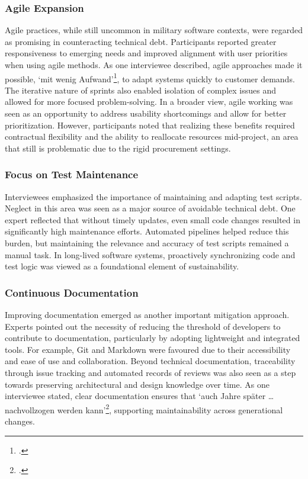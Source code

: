 \subsubsection{Agile Expansion}
Agile practices, while still uncommon in military software contexts, were regarded as promising in counteracting technical debt. Participants reported greater responsiveness to emerging needs and improved alignment with user priorities when using agile methods.
As one interviewee described, agile approaches made it possible, `mit wenig Aufwand'\footcite[85]{Interview32025}, to adapt systems quickly to customer demands. The iterative nature of sprints also enabled isolation of complex issues and allowed for more focused problem-solving.
In a broader view, agile working was seen as an opportunity to address usability shortcomings and allow for better prioritization. However, participants noted that realizing these benefits required contractual flexibility and the ability to reallocate resources mid-project, an area that still is problematic due to the rigid procurement settings.

\subsubsection{Focus on Test Maintenance}
Interviewees emphasized the importance of maintaining and adapting test scripts. Neglect in this area was seen as a major source of avoidable technical debt. One expert reflected that without timely updates, even small code changes resulted in significantly high maintenance efforts.
Automated pipelines helped reduce this burden, but maintaining the relevance and accuracy of test scripts remained a manual task. In long-lived software systems, proactively synchronizing code and test logic was viewed as a foundational element of sustainability.

\subsubsection{Continuous Documentation}
Improving documentation emerged as another important mitigation approach. Experts pointed out the necessity of reducing the threshold of developers to contribute to documentation, particularly by adopting lightweight and integrated tools. For example, Git and Markdown were favoured due to their accessibility and ease of use and collaboration.
Beyond technical documentation, traceability through issue tracking and automated records of reviews was also seen as a step towards preserving architectural and design knowledge over time. As one interviewee stated, clear documentation ensures that `auch Jahre später \ldots nachvollzogen werden kann'\footcite[73]{Interview22025}, supporting maintainability across generational changes.

